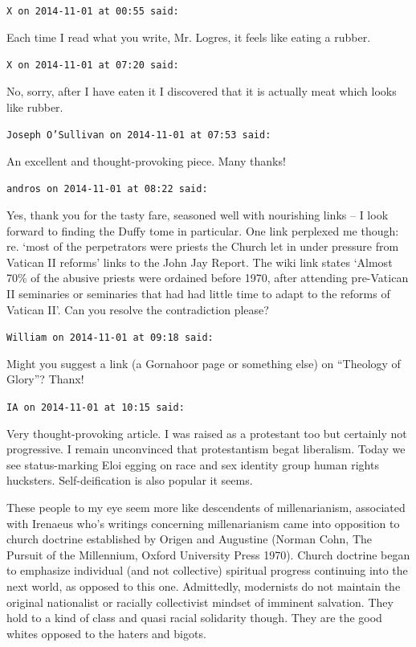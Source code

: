 \begin{footnotesize}
\begin{sffamily}
\texttt{X on 2014-11-01 at 00:55 said:}

Each time I read what you write, Mr. Logres, it feels like eating a rubber.

\hfill

\texttt{X on 2014-11-01 at 07:20 said:}

No, sorry, after I have eaten it I discovered that it is actually meat which looks like rubber.

\hfill

\texttt{Joseph O'Sullivan on 2014-11-01 at 07:53 said:}

An excellent and thought-provoking piece. Many thanks!

\hfill

\texttt{andros on 2014-11-01 at 08:22 said:}

Yes, thank you for the tasty fare, seasoned well with nourishing links -- I look forward to finding the Duffy tome in particular. One link perplexed me though: re. `most of the perpetrators were priests the Church let in under pressure from Vatican II reforms' links to the John Jay Report. The wiki link states `Almost 70\% of the abusive priests were ordained before 1970, after attending pre-Vatican II seminaries or seminaries that had had little time to adapt to the reforms of Vatican II'. Can you resolve the contradiction please?

\hfill

\texttt{William on 2014-11-01 at 09:18 said:}

Might you suggest a link (a Gornahoor page or something else) on ``Theology of Glory''? Thanx!

\hfill

\texttt{IA on 2014-11-01 at 10:15 said:}

Very thought-provoking article. I was raised as a protestant too but certainly not progressive. I remain unconvinced that protestantism begat liberalism. Today we see status-marking Eloi egging on race and sex identity group human rights hucksters. Self-deification is also popular it seems.

These people to my eye seem more like descendents of millenarianism, associated with Irenaeus who's writings concerning millenarianism came into opposition to church doctrine established by Origen and Augustine (Norman Cohn, The Pursuit of the Millennium, Oxford University Press 1970). Church doctrine began to emphasize individual (and not collective) spiritual progress continuing into the next world, as opposed to this one. Admittedly, modernists do not maintain the original nationalist or racially collectivist mindset of imminent salvation. They hold to a kind of class and quasi racial solidarity though. They are the good whites opposed to the haters and bigots.


\end{sffamily}
\end{footnotesize}
